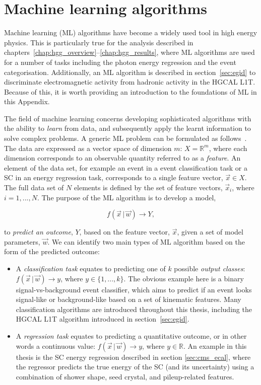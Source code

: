\chapter{Machine learning algorithms}\label{app:ML}
Machine learning (ML) algorithms have become a widely used tool in high energy physics. This is particularly true for the \Hgg analysis described in chapters~\ref{chap:hgg_overview}--\ref{chap:hgg_results}, where ML algorithms are used for a number of tasks including the photon energy regression and the event categorisation. Additionally, an ML algorithm is described in section~\ref{sec:egid} to discriminate electromagnetic activity from hadronic activity in the HGCAL L1T. Because of this, it is worth providing an introduction to the foundations of ML in this Appendix. 

The field of machine learning concerns developing sophisticated algorithms with the ability to \textit{learn} from data, and subsequently apply the learnt information to solve complex problems. A generic ML problem can be formulated as follows~\cite{hastie01statisticallearning}. The data are expressed as a vector space of dimension $m$: $X = \mathbb{R}^m$, where each dimension corresponds to an observable quantity referred to as a \textit{feature}. An element of the data set, for example an event in a event classification task or a SC in an energy regression task, corresponds to a single feature vector, $\vec{x} \in X$. The full data set of $N$ elements is defined by the set of feature vectors, $\vec{x}_i$, where $i=1,...,N$. The purpose of the ML algorithm is to develop a model,

\begin{equation}
    f(\vec{x}\,|\,\vec{w}) \rightarrow Y,
\end{equation}

\noindent
to \textit{predict an outcome}, $Y$, based on the feature vector, $\vec{x}$, given a set of model parameters, $\vec{w}$. We can identify two main types of ML algorithm based on the form of the predicted outcome:

\begin{itemize}
    \item A \textit{classification task} equates to predicting one of $k$ possible \textit{output classes}: $f(\vec{x}\,|\,\vec{w})\rightarrow y$, where $y\in \{1,...,k\}$. The obvious example here is a binary signal-vs-background event classifier, which aims to predict if an event looks signal-like or background-like based on a set of kinematic features. Many classification algorithms are introduced throughout this thesis, including the HGCAL L1T algorithm introduced in section~\ref{sec:egid}.
    
    \item A \textit{regression task} equates to predicting a quantitative outcome, or in other words a continuous value: $f(\vec{x}\,|\,\vec{w})\rightarrow y$, where $y\in \mathbb{R}$. An example in this thesis is the SC energy regression described in section \ref{sec:cms_ecal}, where the regressor predicts the true energy of the SC (and its uncertainty) using a combination of shower shape, seed crystal, and pileup-related features.
\end{itemize}

